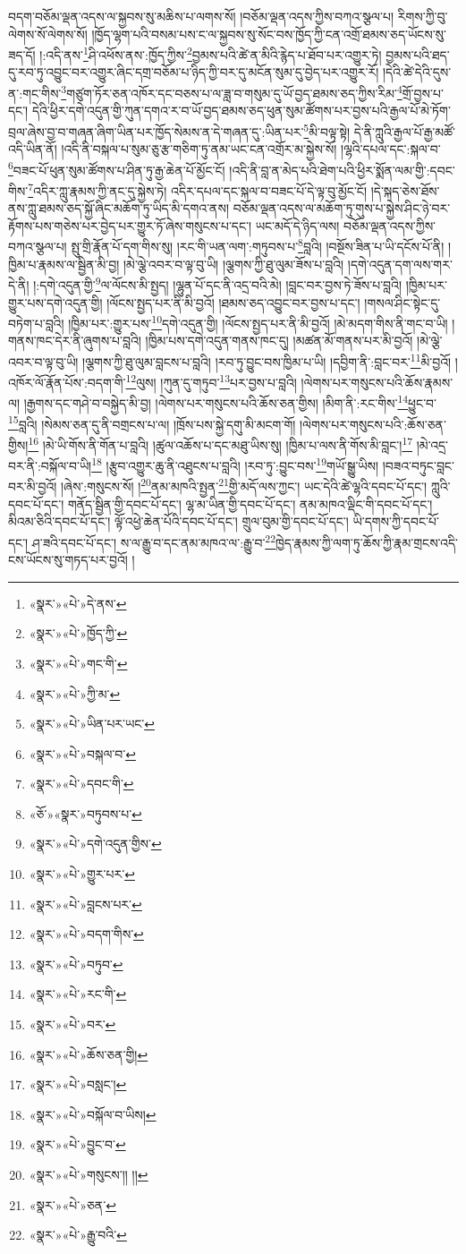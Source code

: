 བདག་བཅོམ་ལྡན་འདས་ལ་སྐྱབས་སུ་མཆིས་པ་ལགས་སོ། །བཅོམ་ལྡན་འདས་ཀྱིས་བཀའ་སྩལ་པ། རིགས་ཀྱི་བུ་ལེགས་སོ་ལེགས་སོ། །ཁྱོད་ལྷག་པའི་བསམ་པས་ང་ལ་སྐྱབས་སུ་སོང་བས་ཁྱོད་ཀྱི་ངན་འགྲོ་ཐམས་ཅད་ཡོངས་སུ་ཟད་དོ། །:འདི་ནས་\footnote{«སྣར་»«པེ་»དེ་ནས་}ཤི་འཕོས་ནས་:ཁྱོད་ཀྱིས་\footnote{«སྣར་»«པེ་»ཁྱོད་ཀྱི་}བྱམས་པའི་ཚེ་ན་མིའི་རྙེད་པ་ཐོབ་པར་འགྱུར་ཏེ། བྱམས་པའི་ཐད་དུ་རབ་ཏུ་འབྱུང་བར་འགྱུར་ཞིང་དགྲ་བཅོམ་པ་ཉིད་ཀྱི་བར་དུ་མངོན་སུམ་དུ་བྱེད་པར་འགྱུར་རོ། །དེའི་ཚེ་དེའི་དུས་ན་:གང་གིས་\footnote{«སྣར་»«པེ་»གང་གི་}གཙུག་ཏོར་ཅན་འཁོར་དང་བཅས་པ་ལ་ཟླ་བ་གསུམ་དུ་ཡོ་བྱད་ཐམས་ཅད་ཀྱིས་རིམ་\footnote{«སྣར་»«པེ་»ཀྱི་མ་}གྲོ་བྱས་པ་དང་། དེའི་ཕྱིར་དགེ་འདུན་གྱི་ཀུན་དགའ་ར་བ་ཡོ་བྱད་ཐམས་ཅད་ཕུན་སུམ་ཚོགས་པར་བྱས་པའི་རྒྱལ་པོ་མེ་ཏོག་བྲལ་ཞེས་བྱ་བ་གཞན་ཞིག་ཡིན་པར་ཁྱོད་སེམས་ན་དེ་གཞན་དུ་:ཡིན་པར་\footnote{«སྣར་»«པེ་»ཡིན་པར་ཡང་}མི་བལྟ་སྟེ། དེ་ནི་ཀླུའི་རྒྱལ་པོ་རྒྱ་མཚོ་འདི་ཡིན་ནོ། །འདི་ནི་བསྐལ་པ་སུམ་ཅུ་རྩ་གཅིག་ཏུ་ནམ་ཡང་ངན་འགྲོར་མ་སྐྱེས་སོ། །ལྷའི་དཔལ་དང་:སྐལ་བ་\footnote{«སྣར་»«པེ་»བསྐལ་བ་}བཟང་པོ་ཕུན་སུམ་ཚོགས་པ་ཤིན་ཏུ་རྒྱ་ཆེན་པོ་མྱོང་ངོ། །འདི་ནི་བླ་ན་མེད་པའི་ཐེག་པའི་ཕྱིར་སྨོན་ལམ་གྱི་:དབང་གིས་\footnote{«སྣར་»«པེ་»དབང་གི་}འདིར་ཀླུ་རྣམས་ཀྱི་ནང་དུ་སྐྱེས་ཏེ། འདིར་དཔལ་དང་སྐལ་བ་བཟང་པོ་དེ་ལྟ་བུ་མྱོང་ངོ། །དེ་སྐད་ཅེས་ཐོས་ནས་ཀླུ་ཐམས་ཅད་སྐྱོ་ཞིང་མཆོག་ཏུ་ཡིད་མི་དགའ་ནས། བཅོམ་ལྡན་འདས་ལ་མཆོག་ཏུ་གུས་པ་སྐྱེས་ཤིང་ཉེ་བར་རྟོགས་པས་གཅེས་པར་བྱེད་པར་གྱུར་ཏོ་ཞེས་གསུངས་པ་དང་། ཡང་མདོ་དེ་ཉིད་ལས། བཅོམ་ལྡན་འདས་ཀྱིས་བཀའ་སྩལ་པ། སྤུ་གྲི་རྣོན་པོ་དག་གིས་སུ། །རང་གི་ཡན་ལག་:གཏུབས་པ་\footnote{«ཅོ་»«སྣར་»བཏུབས་པ་}བླའི། །བསྔོས་ཟིན་པ་ཡི་དངོས་པོ་ནི། །ཁྱིམ་པ་རྣམས་ལ་སྦྱིན་མི་བྱ། །མེ་ལྕེ་འབར་བ་ལྟ་བུ་ཡི། །ལྕགས་ཀྱི་ཐུ་ལུམ་ཟོས་པ་བླའི། །དགེ་འདུན་དག་ལས་གར་དེ་ནི། །:དགེ་འདུན་གྱི་\footnote{«སྣར་»«པེ་»དགེ་འདུན་གྱིས་}ལ་ལོངས་མི་སྤྱད། །ལྷུན་པོ་དང་ནི་འདྲ་བའི་མེ། །བླང་བར་བྱས་ཏེ་ཟོས་པ་བླའི། །ཁྱིམ་པར་གྱུར་པས་དགེ་འདུན་གྱི། །ལོངས་སྤྱད་པར་ནི་མི་བྱའོ། །ཐམས་ཅད་འབྱུང་བར་བྱས་པ་དང་། །གསལ་ཤིང་སྟེང་དུ་བཏེག་པ་བླའི། །ཁྱིམ་པར་:གྱུར་པས་\footnote{«སྣར་»«པེ་»གྱུར་པར་}དགེ་འདུན་གྱི། །ལོངས་སྤྱད་པར་ནི་མི་བྱའོ། །མེ་མདག་གིས་ནི་གང་བ་ཡི། །གནས་ཁང་དེར་ནི་ཞུགས་པ་བླའི། །ཁྱིམ་པས་དགེ་འདུན་གནས་ཁང་དུ། །མཚན་མོ་གནས་པར་མི་བྱའོ། །མེ་ལྕེ་འབར་བ་ལྟ་བུ་ཡི། །ལྕགས་ཀྱི་ཐུ་ལུམ་བླངས་པ་བླའི། །རབ་ཏུ་བྱུང་བས་ཁྱིམ་པ་ཡི། །དབྱིག་ནི་:བླང་བར་\footnote{«སྣར་»«པེ་»བླངས་པར་}མི་བྱའོ། །འཁོར་ལོ་རྣོན་པོས་:བདག་གི་\footnote{«སྣར་»«པེ་»བདག་གིས་}ལུས། །ཀུན་དུ་གཏུབ་\footnote{«སྣར་»«པེ་»བཏུབ་}པར་བྱས་པ་བླའི། །ལེགས་པར་གསུངས་པའི་ཆོས་རྣམས་ལ། །རྒྱགས་དང་གཤེ་བ་བསྐྱེད་མི་བྱ། །ལེགས་པར་གསུངས་པའི་ཆོས་ཅན་གྱིས། །མིག་ནི་:རང་གིས་\footnote{«སྣར་»«པེ་»རང་གི་}ཕྱུང་བ་\footnote{«སྣར་»«པེ་»བར་}བླའི། །སེམས་ཅན་དུ་ནི་བགྲངས་པ་ལ། །ཁྲོས་པས་སྐྱེ་དགུ་མི་མངག་གོ། །ལེགས་པར་གསུངས་པའི་:ཆོས་ཅན་གྱིས།\footnote{«སྣར་»«པེ་»ཆོས་ཅན་གྱི།} །མེ་ཡི་གོས་ནི་གོན་པ་བླའི། །ཚུལ་འཆོས་པ་དང་མཐུ་ཡིས་སུ། །ཁྱིམ་པ་ལས་ནི་གོས་མི་བླང་།\footnote{«སྣར་»«པེ་»བསླང་།} །མེ་འདྲ་བར་ནི་:བསྐོལ་བ་ཡི།\footnote{«སྣར་»«པེ་»བསྐོལ་བ་ཡིས།} །རྩུབ་འགྱུར་ཆུ་ནི་འཐུངས་པ་བླའི། །རབ་ཏུ་:བྱུང་བས་\footnote{«སྣར་»«པེ་»བྱུང་བ་}གཡོ་སྒྱུ་ཡིས། །བཟའ་བཏུང་བླང་བར་མི་བྱའོ། །ཞེས་:གསུངས་སོ། །\footnote{«སྣར་»«པེ་»གསུངས་།། །།}ནམ་མཁའི་སྤྱན་\footnote{«སྣར་»«པེ་»ཅན་}གྱི་མདོ་ལས་ཀྱང་། ཡང་དེའི་ཚེ་ལྷའི་དབང་པོ་དང་། ཀླུའི་དབང་པོ་དང་། གནོད་སྦྱིན་གྱི་དབང་པོ་དང་། ལྷ་མ་ཡིན་གྱི་དབང་པོ་དང་། ནམ་མཁའ་ལྡིང་གི་དབང་པོ་དང་། མིའམ་ཅིའི་དབང་པོ་དང་། ལྟོ་འཕྱེ་ཆེན་པོའི་དབང་པོ་དང་། གྲུལ་བུམ་གྱི་དབང་པོ་དང་། ཡི་དགས་ཀྱི་དབང་པོ་དང་། ཤ་ཟའི་དབང་པོ་དང་། ས་ལ་རྒྱུ་བ་དང་ནམ་མཁའ་ལ་:རྒྱུ་བ་\footnote{«སྣར་»«པེ་»རྒྱུ་བའི་}ཁྱེད་རྣམས་ཀྱི་ལག་ཏུ་ཆོས་ཀྱི་རྣམ་གྲངས་འདི་ངས་ཡོངས་སུ་གཏད་པར་བྱའོ། །
